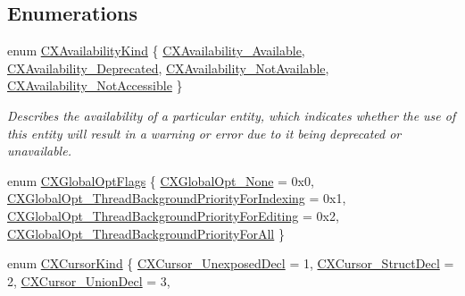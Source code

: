\subsection*{Enumerations}
\begin{DoxyCompactItemize}
\item 
enum \hyperlink{group__CINDEX_gada331ea0195e952c8f181ecf15e83d71}{C\+X\+Availability\+Kind} \{ \hyperlink{group__CINDEX_ggada331ea0195e952c8f181ecf15e83d71a6e2a9a033b06aa1ac8ab0b8ad49f8467}{C\+X\+Availability\+\_\+\+Available}, 
\hyperlink{group__CINDEX_ggada331ea0195e952c8f181ecf15e83d71a8295a994c76ec17e391050da7334e8fc}{C\+X\+Availability\+\_\+\+Deprecated}, 
\hyperlink{group__CINDEX_ggada331ea0195e952c8f181ecf15e83d71af70fbd074c138cdf81b0286d202b0fa6}{C\+X\+Availability\+\_\+\+Not\+Available}, 
\hyperlink{group__CINDEX_ggada331ea0195e952c8f181ecf15e83d71af6542f250a1d21e256cd543669a49435}{C\+X\+Availability\+\_\+\+Not\+Accessible}
 \}\begin{DoxyCompactList}\small\item\em Describes the availability of a particular entity, which indicates whether the use of this entity will result in a warning or error due to it being deprecated or unavailable. \end{DoxyCompactList}
\item 
enum \hyperlink{group__CINDEX_ga1b451634928d6bcc961bf72a40e4d035}{C\+X\+Global\+Opt\+Flags} \{ \hyperlink{group__CINDEX_gga1b451634928d6bcc961bf72a40e4d035a869efb651da9e6d3da10a0fb43941d0d}{C\+X\+Global\+Opt\+\_\+\+None} = 0x0, 
\hyperlink{group__CINDEX_gga1b451634928d6bcc961bf72a40e4d035aba7b16ae973f035cd4156eeae579e47a}{C\+X\+Global\+Opt\+\_\+\+Thread\+Background\+Priority\+For\+Indexing} = 0x1, 
\hyperlink{group__CINDEX_gga1b451634928d6bcc961bf72a40e4d035a0da291ff18cccf9fcce2e75d46337a63}{C\+X\+Global\+Opt\+\_\+\+Thread\+Background\+Priority\+For\+Editing} = 0x2, 
\hyperlink{group__CINDEX_gga1b451634928d6bcc961bf72a40e4d035ad38031ffee9be191b92869bdf0fe82e2}{C\+X\+Global\+Opt\+\_\+\+Thread\+Background\+Priority\+For\+All}
 \}
\item 
enum \hyperlink{group__CINDEX_gaaccc432245b4cd9f2d470913f9ef0013}{C\+X\+Cursor\+Kind} \{ \newline
\hyperlink{group__CINDEX_ggaaccc432245b4cd9f2d470913f9ef0013ab6c248d25235d6188a1c56ecba85efaf}{C\+X\+Cursor\+\_\+\+Unexposed\+Decl} = 1, 
\hyperlink{group__CINDEX_ggaaccc432245b4cd9f2d470913f9ef0013abcdfdbef4602f6b4f23cf05909949a8e}{C\+X\+Cursor\+\_\+\+Struct\+Decl} = 2, 
\hyperlink{group__CINDEX_ggaaccc432245b4cd9f2d470913f9ef0013a3a9bcc720d2250bd42fd9beab97f681a}{C\+X\+Cursor\+\_\+\+Union\+Decl} = 3, 

\end{DoxyCompactItemize}
